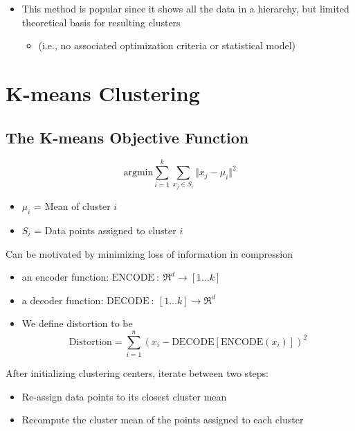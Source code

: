 \documentclass[10pt]{article}
\begin{document}
\begin{itemize}
    \item This method is popular since it shows all the data in a hierarchy, but limited theoretical basis for resulting clusters
    \begin{itemize}
        \item (i.e., no associated optimization criteria or statistical model)
    \end{itemize}
\end{itemize}

\section*{K-means Clustering}
\subsection*{The K-means Objective Function}
\[\text{argmin} \sum_{i = 1}^k \sum_{x_j \in S_i} \Vert x_j - \mu_i \Vert^2\]
\begin{itemize}
    \item $\mu_i$ = Mean of cluster $i$
    \item $S_i$ = Data points assigned to cluster $i$
\end{itemize}
Can be motivated by minimizing loss of information in compression
\begin{itemize}
    \item an encoder function: $\text{ENCODE} \::\: \mathfrak{R}^d \rightarrow [1 \dots k]$
    \item a decoder function: $\text{DECODE} \::\: [1 \dots k] \rightarrow \mathfrak{R}^d$
    \item We define distortion to be
    \[\text{Distortion} = \sum_{i = 1}^n(x_i - \text{DECODE}[\text{ENCODE}(x_i)])^2\]
\end{itemize}
After initializing clustering centers, iterate between two steps:
\begin{itemize}
    \item Re-assign data points to its closest cluster mean
    \item Recompute the cluster mean of the points assigned to each cluster
\end{itemize}
\end{document}
